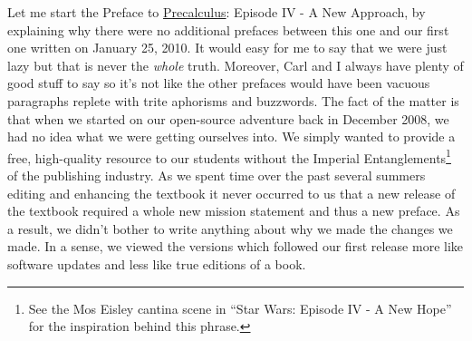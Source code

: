 \documentclass{ximera}
\begin{document}
	\author{Stitz-Zeager}


\noindent Let me start the Preface to \underline{Precalculus}: Episode IV - A New Approach, by explaining why there were no additional prefaces between this one and our first one written on January 25, 2010.  It would easy for me to say that we were just lazy but that is never the \emph{whole} truth.  Moreover, Carl and I always have plenty of good stuff to say so it's not like the other prefaces would have been vacuous paragraphs replete with trite aphorisms and buzzwords.  The fact of the matter is that when we started on our open-source adventure back in December 2008, we had no idea what we were getting ourselves into.  We simply wanted to provide a free, high-quality resource to our students without the Imperial Entanglements\footnote{See the Mos Eisley cantina scene in ``Star Wars: Episode IV - A New Hope'' for the inspiration behind this phrase.} of the publishing industry.  As we spent time over the past several summers editing and enhancing the textbook it never occurred to us that a new release of the textbook required a whole new mission statement and thus a new preface.  As a result, we didn't bother to write anything about why we made the changes we made.  In a sense, we viewed the versions which followed our first release more like software updates and less like true editions of a book.

\medskip
\end{document}
